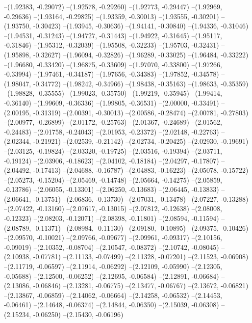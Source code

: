 --(1.92383, -0.29072)
--(1.92578, -0.29260)
--(1.92773, -0.29447)
--(1.92969, -0.29636)
--(1.93164, -0.29825)
--(1.93359, -0.30013)
--(1.93555, -0.30201)
--(1.93750, -0.30423)
--(1.93945, -0.30636)
--(1.94141, -0.30840)
--(1.94336, -0.31046)
--(1.94531, -0.31243)
--(1.94727, -0.31443)
--(1.94922, -0.31645)
--(1.95117, -0.31846)
--(1.95312, -0.32039)
--(1.95508, -0.32233)
--(1.95703, -0.32431)
--(1.95898, -0.32627)
--(1.96094, -0.32826)
--(1.96289, -0.33025)
--(1.96484, -0.33222)
--(1.96680, -0.33420)
--(1.96875, -0.33609)
--(1.97070, -0.33800)
--(1.97266, -0.33994)
--(1.97461, -0.34187)
--(1.97656, -0.34383)
--(1.97852, -0.34578)
--(1.98047, -0.34772)
--(1.98242, -0.34966)
--(1.98438, -0.35163)
--(1.98633, -0.35359)
--(1.98828, -0.35555)
--(1.99023, -0.35750)
--(1.99219, -0.35945)
--(1.99414, -0.36140)
--(1.99609, -0.36336)
--(1.99805, -0.36531)
--(2.00000, -0.33491)
--(2.00195, -0.31319)
--(2.00391, -0.30013)
--(2.00586, -0.28474)
--(2.00781, -0.27803)
--(2.00977, -0.26899)
--(2.01172, -0.25763)
--(2.01367, -0.24689)
--(2.01562, -0.24483)
--(2.01758, -0.24043)
--(2.01953, -0.23372)
--(2.02148, -0.22763)
--(2.02344, -0.21921)
--(2.02539, -0.21142)
--(2.02734, -0.20425)
--(2.02930, -0.19691)
--(2.03125, -0.19824)
--(2.03320, -0.19725)
--(2.03516, -0.19394)
--(2.03711, -0.19124)
--(2.03906, -0.18623)
--(2.04102, -0.18184)
--(2.04297, -0.17807)
--(2.04492, -0.17413)
--(2.04688, -0.16787)
--(2.04883, -0.16223)
--(2.05078, -0.15722)
--(2.05273, -0.15204)
--(2.05469, -0.14748)
--(2.05664, -0.14275)
--(2.05859, -0.13786)
--(2.06055, -0.13301)
--(2.06250, -0.13683)
--(2.06445, -0.13833)
--(2.06641, -0.13751)
--(2.06836, -0.13730)
--(2.07031, -0.13478)
--(2.07227, -0.13288)
--(2.07422, -0.13160)
--(2.07617, -0.13015)
--(2.07812, -0.12638)
--(2.08008, -0.12323)
--(2.08203, -0.12071)
--(2.08398, -0.11801)
--(2.08594, -0.11594)
--(2.08789, -0.11371)
--(2.08984, -0.11130)
--(2.09180, -0.10895)
--(2.09375, -0.10426)
--(2.09570, -0.10021)
--(2.09766, -0.09677)
--(2.09961, -0.09317)
--(2.10156, -0.09019)
--(2.10352, -0.08704)
--(2.10547, -0.08372)
--(2.10742, -0.08045)
--(2.10938, -0.07781)
--(2.11133, -0.07499)
--(2.11328, -0.07201)
--(2.11523, -0.06908)
--(2.11719, -0.06597)
--(2.11914, -0.06292)
--(2.12109, -0.05990)
--(2.12305, -0.05688)
--(2.12500, -0.06252)
--(2.12695, -0.06584)
--(2.12891, -0.06684)
--(2.13086, -0.06846)
--(2.13281, -0.06775)
--(2.13477, -0.06767)
--(2.13672, -0.06821)
--(2.13867, -0.06859)
--(2.14062, -0.06664)
--(2.14258, -0.06532)
--(2.14453, -0.06461)
--(2.14648, -0.06374)
--(2.14844, -0.06350)
--(2.15039, -0.06308)
--(2.15234, -0.06250)
--(2.15430, -0.06196)
